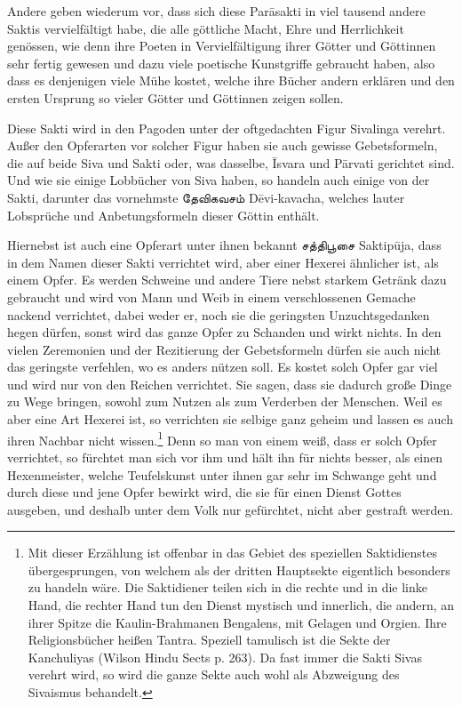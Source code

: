\documentclass{article}
\newcommand{\TamilText}[1]{\texttamil{#1}}
\newcommand{\tam}[1]{\TamilText{#1}}
\begin{document}
Andere geben wiederum vor, dass sich diese Par\={a}sakti in viel tausend andere Saktis vervielfältigt habe, die alle göttliche Macht, Ehre und Herrlichkeit genössen, wie denn ihre Poeten in Vervielfältigung ihrer Götter und Göttinnen sehr fertig gewesen und dazu viele poetische Kunstgriffe gebraucht haben, also dass es denjenigen viele Mühe kostet, welche ihre Bücher andern erklären und den ersten Ursprung so vieler Götter und Göttinnen zeigen sollen.

Diese Sakti wird in den Pagoden unter der oftgedachten Figur Sivalinga verehrt. Außer den Opferarten vor solcher Figur haben sie auch gewisse Gebetsformeln, die auf beide Siva und Sakti oder, was dasselbe, \={I}svara und P\={a}rvati gerichtet sind. Und wie sie einige Lobbücher von Siva haben, so handeln auch einige von der Sakti, darunter das vornehmste \tam{தேவிகவசம்} D\={e}vi-kavacha, welches lauter Lobsprüche und Anbetungsformeln dieser Göttin enthält.

Hiernebst ist auch eine Opferart unter ihnen bekannt \tam{சத்திபூசை} Saktip\={u}ja, dass in dem Namen dieser Sakti verrichtet wird, aber einer Hexerei ähnlicher ist, als einem Opfer. Es werden Schweine und andere Tiere nebst starkem Getränk dazu gebraucht und wird von Mann und Weib in einem verschlossenen Gemache nackend verrichtet, dabei weder er, noch sie die geringsten Unzuchtsgedanken hegen dürfen, sonst wird das ganze Opfer zu Schanden und wirkt nichts. In den vielen Zeremonien und der Rezitierung der Gebetsformeln dürfen sie auch nicht das geringste verfehlen, wo es anders nützen soll. Es kostet solch Opfer gar viel und wird nur von den Reichen verrichtet. Sie sagen, dass sie dadurch große Dinge zu Wege bringen, sowohl zum Nutzen als zum Verderben der Menschen. Weil es aber eine Art Hexerei ist, so verrichten sie selbige ganz geheim und lassen es auch ihren Nachbar nicht wissen.\footnote{Mit dieser Erzählung ist offenbar in das Gebiet des speziellen Saktidienstes übergesprungen, von welchem als der dritten Hauptsekte eigentlich besonders zu handeln wäre. Die Saktidiener teilen sich in die rechte und in die linke Hand, die rechter Hand tun den Dienst mystisch und innerlich, die andern, an ihrer Spitze die Kaulin-Brahmanen Bengalens, mit Gelagen und Orgien. Ihre Religionsbücher heißen Tantra. Speziell tamulisch ist die Sekte der Kanchuliyas (Wilson Hindu Sects p. 263). Da fast immer die Sakti Sivas verehrt wird, so wird die ganze Sekte auch wohl als Abzweigung des Sivaismus behandelt.} Denn so man von einem weiß, dass er solch Opfer verrichtet, so fürchtet man sich vor ihm und hält ihn für nichts besser, als einen Hexenmeister, welche Teufelskunst unter ihnen gar sehr im Schwange geht und durch diese und jene Opfer bewirkt wird, die sie für einen Dienst Gottes ausgeben, und deshalb unter dem Volk nur gefürchtet, nicht aber gestraft werden.
\end{document}
